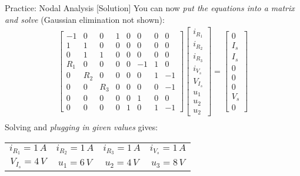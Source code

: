 \begin{frame}{Practice: Nodal Analysis [Solution]}
    \color{blue}
    You can now \textit{put the equations into a matrix and solve} (Gaussian elimination not shown):
    \small{
        \begin{align*}
            \begin{bmatrix}
                -1 & 0 & 0 & 1 & 0 & 0 & 0 & 0 \\
                1 & 1 & 0 & 0 & 0 & 0 & 0 & 0\\
                0 & 1 & 1 & 0 & 0 & 0 & 0 & 0 \\
                R_1 & 0 & 0 & 0 & 0 & -1 & 1 & 0 \\
                0 & R_2 & 0 & 0 & 0 & 0 & 1 & -1 \\
                0 & 0 & R_3 & 0 & 0 & 0 & 0 & -1 \\
                0 & 0 & 0 & 0 & 0 & 1 & 0 & 0 \\
                0 & 0 & 0 & 0 & 1 & 0 & 1 & -1
            \end{bmatrix}
            \begin{bmatrix}
                i_{R_1} \\ i_{R_2} \\ i_{R_3} \\ i_{V_s} \\ V_{I_s} \\ u_1 \\ u_2 \\ u_2
            \end{bmatrix} =
            \begin{bmatrix}
                0 \\ I_s \\ I_s \\ 0 \\ 0 \\ 0 \\ V_s \\ 0
            \end{bmatrix} \\[-10pt]
        \end{align*}
    }
    Solving and \textit{plugging in given values} gives: \\[5pt]
        \begin{tabular}{|c c c c|}
            \hline
            $i_{R_1} = 1\,A$ & $i_{R_2} = 1\,A$ & $i_{R_3} = 1\,A$ & $i_{V_s} = 1\,A$ \\ 
            $V_{I_s} = 4\,V$ & $u_1 = 6\,V$ & $u_2 = 4\,V$ & $u_3 = 8\,V$\\
            \hline
        \end{tabular}
\end{frame}

